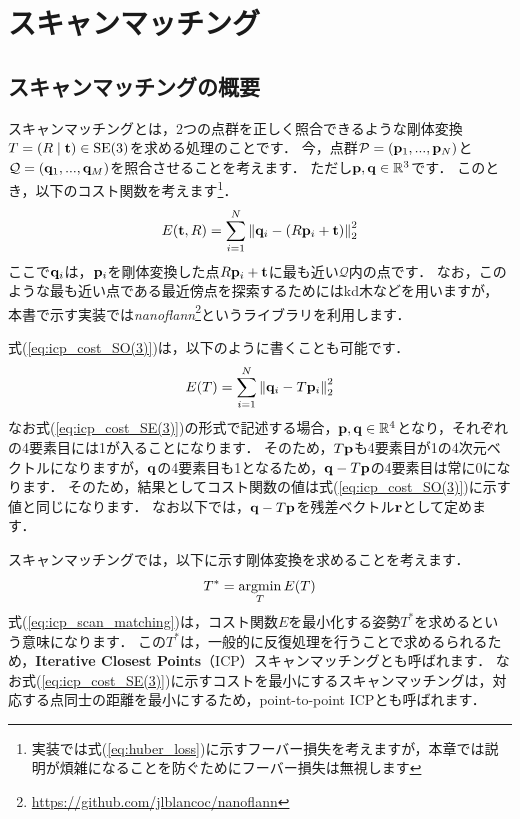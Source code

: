 \chapter{スキャンマッチング}
\label{sec:scan_matching}

\section{スキャンマッチングの概要}

スキャンマッチングとは，2つの点群を正しく照合できるような剛体変換$T = \left( R \mid {\bf t} \right) \in \rm{SE}(3)$を求める処理のことです．
今，点群$\mathcal{P} = ({\bf p}_{1}, ..., {\bf p}_{N})$と$\mathcal{Q} = ({\bf q}_{1}, ..., {\bf q}_{M})$を照合させることを考えます．
ただし${\bf p}, {\bf q} \in \mathbb{R}^{3}$です．
このとき，以下のコスト関数を考えます\footnote{実装では式(\ref{eq:huber_loss})に示すフーバー損失を考えますが，本章では説明が煩雑になることを防ぐためにフーバー損失は無視します}．
%
\begin{align}
  E({\bf t}, R) = \sum_{i=1}^{N} \left\| {\bf q}_{i} - \left( R {\bf p}_{i} + {\bf t} \right) \right\|_{2}^{2}
  \label{eq:icp_cost_SO(3)}
\end{align}
%
ここで${\bf q}_{i}$は，${\bf p}_{i}$を剛体変換した点$R {\bf p}_{i} + {\bf t}$に最も近い$\mathcal{Q}$内の点です．
なお，このような最も近い点である最近傍点を探索するためにはkd木などを用いますが，本書で示す実装では{\it nanoflann}\footnote{ \url{https://github.com/jlblancoc/nanoflann} }というライブラリを利用します．

式(\ref{eq:icp_cost_SO(3)})は，以下のように書くことも可能です．
%
\begin{align}
  E(T) = \sum_{i=1}^{N} \left\| {\bf q}_{i} - T {\bf p}_{i} \right\|_{2}^{2}
  \label{eq:icp_cost_SE(3)}
\end{align}
%
なお式(\ref{eq:icp_cost_SE(3)})の形式で記述する場合，${\bf p}, {\bf q} \in \mathbb{R}^{4}$となり，それぞれの4要素目には1が入ることになります．
そのため，$T {\bf p}$も4要素目が1の4次元ベクトルになりますが，${\bf q}$の4要素目も1となるため，${\bf q} - T {\bf p}$の4要素目は常に0になります．
そのため，結果としてコスト関数の値は式(\ref{eq:icp_cost_SO(3)})に示す値と同じになります．
なお以下では，${\bf q} - T {\bf p}$を残差ベクトル${\bf r}$として定めます．

スキャンマッチングでは，以下に示す剛体変換を求めることを考えます．
%
\begin{align}
  T^{*} = \mathop{\rm argmin}\limits_{T} E(T)
  \label{eq:icp_scan_matching}
\end{align}
%
式(\ref{eq:icp_scan_matching})は，コスト関数$E$を最小化する姿勢$T^{*}$を求めるという意味になります．
この$T^{*}$は，一般的に反復処理を行うことで求めるられるため，{\bf Iterative Closest Points}（ICP）スキャンマッチングとも呼ばれます．
なお式(\ref{eq:icp_cost_SE(3)})に示すコストを最小にするスキャンマッチングは，対応する点同士の距離を最小にするため，point-to-point ICPとも呼ばれます．


